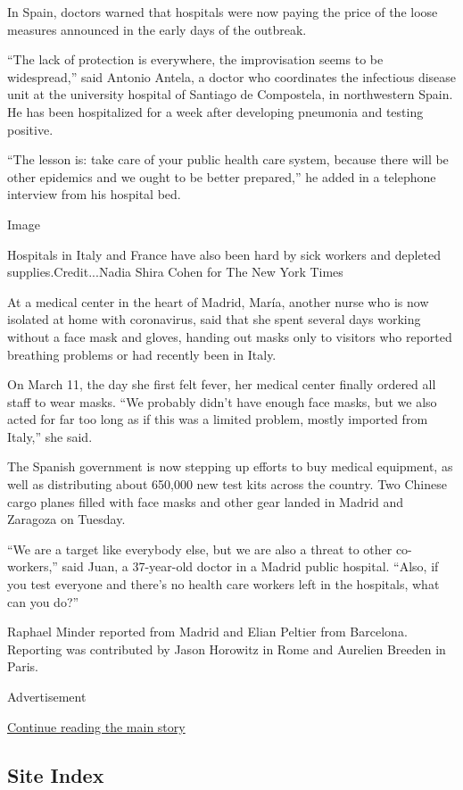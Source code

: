 In Spain, doctors warned that hospitals were now paying the price of the
loose measures announced in the early days of the outbreak.

``The lack of protection is everywhere, the improvisation seems to be
widespread,'' said Antonio Antela, a doctor who coordinates the
infectious disease unit at the university hospital of Santiago de
Compostela, in northwestern Spain. He has been hospitalized for a week
after developing pneumonia and testing positive.

``The lesson is: take care of your public health care system, because
there will be other epidemics and we ought to be better prepared,'' he
added in a telephone interview from his hospital bed.

Image

Hospitals in Italy and France have also been hard by sick workers and
depleted supplies.Credit...Nadia Shira Cohen for The New York Times

At a medical center in the heart of Madrid, María, another nurse who is
now isolated at home with coronavirus, said that she spent several days
working without a face mask and gloves, handing out masks only to
visitors who reported breathing problems or had recently been in Italy.

On March 11, the day she first felt fever, her medical center finally
ordered all staff to wear masks. ``We probably didn't have enough face
masks, but we also acted for far too long as if this was a limited
problem, mostly imported from Italy,'' she said.

The Spanish government is now stepping up efforts to buy medical
equipment, as well as distributing about 650,000 new test kits across
the country. Two Chinese cargo planes filled with face masks and other
gear landed in Madrid and Zaragoza on Tuesday.

``We are a target like everybody else, but we are also a threat to other
co-workers,'' said Juan, a 37-year-old doctor in a Madrid public
hospital. ``Also, if you test everyone and there's no health care
workers left in the hospitals, what can you do?''

Raphael Minder reported from Madrid and Elian Peltier from Barcelona.
Reporting was contributed by Jason Horowitz in Rome and Aurelien Breeden
in Paris.

Advertisement

\protect\hyperlink{after-bottom}{Continue reading the main story}

\hypertarget{site-index}{%
\subsection{Site Index}\label{site-index}}

